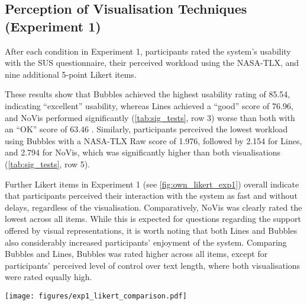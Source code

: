 \subsection{Perception of Visualisation Techniques (Experiment 1)}
\label{sec:perception_exp1}
After each condition in Experiment 1, participants rated the system's usability with the SUS questionnaire, their perceived workload using the NASA-TLX, and nine additional 5-point Likert items.

These results show that Bubbles achieved the highest usability rating of 85.54, indicating ``excellent'' usability, whereas Lines achieved a ``good'' score of 76.96, and NoVis performed significantly (\cref{tab:sig_tests}, row 3) worse than both with an ``OK'' score of 63.46 \cite{susBangor2009}.
Similarly, participants perceived the lowest workload using Bubbles with a NASA-TLX Raw score of 1.976, followed by 2.154 for Lines, and 2.794 for NoVis, which was significantly higher than both visualisations (\cref{tab:sig_tests}, row 5).

Further Likert items in Experiment 1 (see \cref{fig:own_likert_exp1}) overall indicate that participants perceived their interaction with the system as fast and without delays, regardless of the visualisation.
Comparatively, NoVis was clearly rated the lowest across all items.
While this is expected for questions regarding the support offered by visual representations, it is worth noting that both Lines and Bubbles also %
considerably increased participants' enjoyment of the system.
Comparing Bubbles and Lines, Bubbles was rated higher across all items, except for participants' perceived level of control over text length, where both visualisations were rated equally high. 

\begin{figure*}
    \centering
    \texttt{[image: figures/exp1\_likert\_comparison.pdf]}
    \caption{Likert results on participants' perception of interaction with our prototype and the visual presentations, rated after each condition in Experiment 1. These rating overall indicate that participants felt that their interaction with the system was fast and without delays, regardless of the visualisation technique, but comparatively, NoVis was clearly rated the lowest across all items.}
    \label{fig:own_likert_exp1}
\end{figure*}


